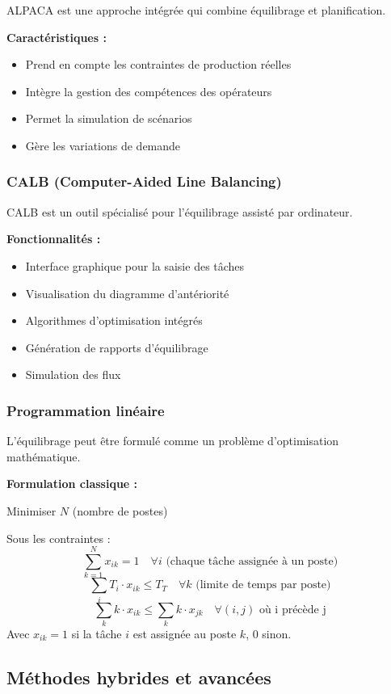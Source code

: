 \documentclass[12pt,a4paper]{article}
\begin{document}
ALPACA est une approche intégrée qui combine équilibrage et planification.

\textbf{Caractéristiques :}
\begin{itemize}
    \item Prend en compte les contraintes de production réelles
    \item Intègre la gestion des compétences des opérateurs
    \item Permet la simulation de scénarios
    \item Gère les variations de demande
\end{itemize}

\subsubsection{CALB (Computer-Aided Line Balancing)}

CALB est un outil spécialisé pour l'équilibrage assisté par ordinateur.

\textbf{Fonctionnalités :}
\begin{itemize}
    \item Interface graphique pour la saisie des tâches
    \item Visualisation du diagramme d'antériorité
    \item Algorithmes d'optimisation intégrés
    \item Génération de rapports d'équilibrage
    \item Simulation des flux
\end{itemize}

\subsubsection{Programmation linéaire}

L'équilibrage peut être formulé comme un problème d'optimisation mathématique.

\textbf{Formulation classique :}

Minimiser $N$ (nombre de postes)

Sous les contraintes :
\[
\sum_{k=1}^{N} x_{ik} = 1 \quad \forall i \text{ (chaque tâche assignée à un poste)}
\]
\[
\sum_{i} T_i \cdot x_{ik} \leq T_T \quad \forall k \text{ (limite de temps par poste)}
\]
\[
\sum_{k} k \cdot x_{ik} \leq \sum_{k} k \cdot x_{jk} \quad \forall (i,j) \text{ où i précède j}
\]
Avec $x_{ik} = 1$ si la tâche $i$ est assignée au poste $k$, 0 sinon.

\subsection{Méthodes hybrides et avancées}
\end{document}
